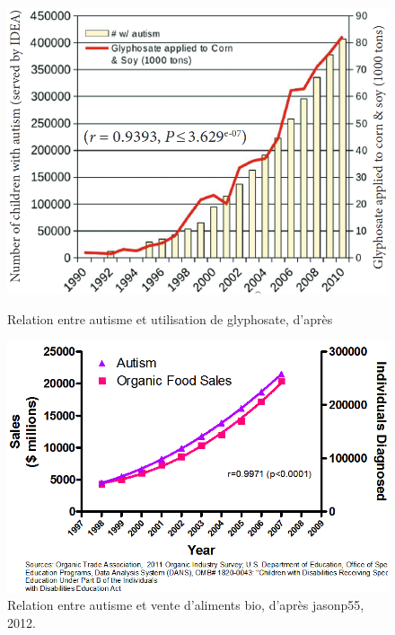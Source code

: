 \begin{figure}[H]
	\begin{minipage}[b]{.46\linewidth}
		\centering
		\includegraphics[width=\linewidth]{img/autisme_glyphosate.png}
		\caption{Relation entre autisme et utilisation de glyphosate, d'après \cite[Figure 2, p. 51]{shaw_elevated_2017} \label{fig:autisme-glyphosate}}
	\end{minipage} \hfill
	\begin{minipage}[b]{.46\linewidth}
		\centering
		\includegraphics[width=\linewidth]{img/autisme_bio.png}
		\caption[Relation entre autisme et vente d'aliments \og bio\fg{}]{Relation entre autisme et vente d'aliments \og bio\fg{}, d'après \og jasonp55\fg{}, 2012.}
		\label{fig:autisme-bio}
	\end{minipage}
\end{figure}

